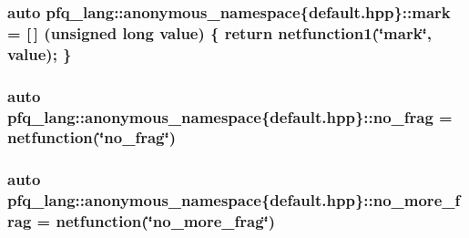 \hypertarget{namespacepfq__lang_1_1anonymous__namespace_02default_8hpp_03_ad6142fe3a0fc859f25ea16956f52a5f0}{
\subsubsection[{mark}]{\setlength{\rightskip}{0pt plus 5cm}auto pfq\+\_\+lang\+::anonymous\+\_\+namespace\{default.\+hpp\}\+::mark = \mbox{[}$\,$\mbox{]} (unsigned long value) \{ return {\bf netfunction1}(\char`\"{}mark\char`\"{}, value); \}}}\label{namespacepfq__lang_1_1anonymous__namespace_02default_8hpp_03_ad6142fe3a0fc859f25ea16956f52a5f0}
\hypertarget{namespacepfq__lang_1_1anonymous__namespace_02default_8hpp_03_a60b130b2b5a08d0c83063ed584b79396}{
\subsubsection[{no\+\_\+frag}]{\setlength{\rightskip}{0pt plus 5cm}auto pfq\+\_\+lang\+::anonymous\+\_\+namespace\{default.\+hpp\}\+::no\+\_\+frag = {\bf netfunction}(\char`\"{}no\+\_\+frag\char`\"{})}}\label{namespacepfq__lang_1_1anonymous__namespace_02default_8hpp_03_a60b130b2b5a08d0c83063ed584b79396}
\hypertarget{namespacepfq__lang_1_1anonymous__namespace_02default_8hpp_03_ac400453f07ca5fc4ef28d20085f149c2}{
\subsubsection[{no\+\_\+more\+\_\+frag}]{\setlength{\rightskip}{0pt plus 5cm}auto pfq\+\_\+lang\+::anonymous\+\_\+namespace\{default.\+hpp\}\+::no\+\_\+more\+\_\+frag = {\bf netfunction}(\char`\"{}no\+\_\+more\+\_\+frag\char`\"{})}}\label{namespacepfq__lang_1_1anonymous__namespace_02default_8hpp_03_ac400453f07ca5fc4ef28d20085f149c2}
